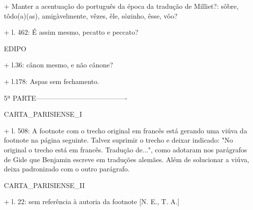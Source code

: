 + Manter a acentuação do português da época da tradução de Milliet?: sôbre, tôdo(a)(as), amigàvelmente, vêzes, êle, sòzinho, êsse, vôo?

+ l. 462: É assim mesmo, pecatto e peccato?

EDIPO

+ l.36: cânon mesmo, e não cânone?

+ l.178: Aspas sem fechamento.


5ª PARTE----------------------------------------

CARTA_PARISIENSE_I

+ l. 508: A footnote com o trecho original em francês está gerando uma viúva da footnote na página seguinte. Talvez suprimir o trecho e deixar indicado: "No original o trecho está em francês. Tradução de...", como adotaram nos parágrafos de Gide que Benjamin escreve em traduções alemães. Além de solucionar a viúva, deixa padronizado com o outro parágrafo.


CARTA_PARISIENSE_II

+ l. 22: sem referência à autoria da footnote [N. E., T. A.]
